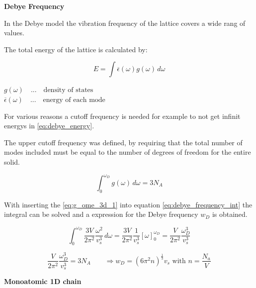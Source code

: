 \textbf{Debye Frequency}

In the Debye model the vibration frequency of the lattice covers
a wide rang of values.

The total energy of the lattice is calculated by:

\begin{equation}
    E = \int \overline{\epsilon}(\omega) g(\omega) \, d\omega
    \label{eq:debye_energy}
\end{equation}

$g(\omega) \quad ... \quad \textrm{density of states}$\\
$\overline{\epsilon}(\omega) \quad ... \quad \textrm{energy of each mode}$

For various reasons a cutoff frequency is needed for example to not get
infinit energys in \autoref{eq:debye_energy}.

The upper cutoff frequency was defined, by requiring that the total number of 
modes included must be equal to the number of degrees of freedom for the entire
solid.

\begin{equation}
    \int_0^{\omega_D} g(\omega) \, d\omega = 3N_A
    \label{eq:debye_frequency_int}
\end{equation}

With inserting the \autoref{eq:g_ome_3d_1} into equation 
\autoref{eq:debye_frequency_int} the integral can be solved and 
a expression for the Debye frequency $w_D$ is obtained.

$$\int_0^{\omega_D} \frac{3V}{2\pi^2} \frac{\omega^2}{v_s^3} \, d\omega = 
    \frac{3V}{2\pi^2} \frac{1}{v_s^3} \left[\omega\right]_0^{\omega_D} =
    \frac{V}{2\pi^2} \frac{\omega_D^3}{v_s^3}
$$

$$ \frac{V}{2\pi^2} \frac{\omega_D^3}{v_s^3} = 3N_A \qquad \Rightarrow
    w_D = (6\pi^2 n)^{\frac{1}{3}} v_s \textrm{ with } n=\frac{N_a}{V}$$

\textbf{Monoatomic 1D chain}

